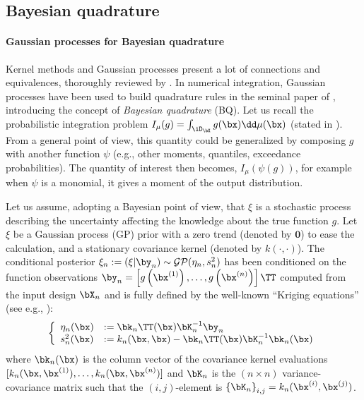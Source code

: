 
\subsection{Bayesian quadrature}
\paragraph{Gaussian processes for Bayesian quadrature}%

Kernel methods and Gaussian processes present a lot of connections and equivalences, thoroughly reviewed by \cite{motonobu_2018}. 
In numerical integration, Gaussian processes have been used to build quadrature rules in the seminal paper of \cite{ohagan_1991}, introducing the concept of \emph{Bayesian quadrature} (BQ). 
Let us recall the probabilistic integration problem $I_\mu(g) = \int_{\iD_\bX} g(\bx) \dd \mu(\bx)$ (stated in ). 
From a general point of view, this quantity could be generalized by composing $g$ with another function $\psi$ (e.g., other moments, quantiles, exceedance probabilities). 
The quantity of interest then becomes, $I_\mu(\psi(g))$, for example when $\psi$ is a monomial, it gives a moment of the output distribution.

Let us assume, adopting a Bayesian point of view, that $\xi$ is a stochastic process describing the uncertainty affecting the knowledge about the true function $g$. 
Let $\xi$ be a Gaussian process (GP) prior with a zero trend (denoted by $\textbf{0}$) to ease the calculation, and a stationary covariance kernel (denoted by $k(\cdot, \cdot)$). 
The conditional posterior $\xi_n := (\xi | \by_n) \sim \mathcal{GP}(\eta_n, s_n^2)$ has been conditioned on the function observations $\by_n = \left[g\left(\bx^{(1)}\right), \ldots, g\left(\bx^{(n)}\right)\right]\TT$ computed from the input design $\bX_n$ and is fully defined by the well-known ``Kriging equations'' (see e.g., \cite{rasmussen_2006}):
\begin{equation}
    \left\{
    \begin{array}{ll}
        \eta_n(\bx) &:= \bk_n\TT(\bx) \bK_n^{-1} \by_n\\
        s_n^2(\bx) &:= k_n(\bx, \bx) - \bk_n\TT(\bx) \bK_n^{-1} \bk_n(\bx)
    \end{array}
\right.
\label{eq:kriging}
\end{equation}
where $\bk_n(\bx)$ is the column vector of the covariance kernel evaluations $[k_n(\bx, \bx^{(1)}), \dots,\allowbreak k_n(\bx, \bx^{(n)})]$ and $\bK_n$ is the $(n \times n)$ variance-covariance matrix such that the $(i, j)$-element is $\left\{\bK_n \right\}_{i, j}=k_n(\bx^{(i)}, \bx^{(j)})$.

